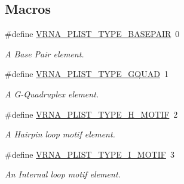 \subsection*{Macros}
\begin{DoxyCompactItemize}
\item 
\mbox{\label{group__struct__utils__plist_ga7c7484a8a1e6704b1aefaf589f3b27c1}} 
\#define \mbox{\hyperlink{group__struct__utils__plist_ga7c7484a8a1e6704b1aefaf589f3b27c1}{V\+R\+N\+A\+\_\+\+P\+L\+I\+S\+T\+\_\+\+T\+Y\+P\+E\+\_\+\+B\+A\+S\+E\+P\+A\+IR}}~0
\begin{DoxyCompactList}\small\item\em A Base Pair element. \end{DoxyCompactList}\item 
\mbox{\label{group__struct__utils__plist_gac91ab79e9feede5347103949ecf04f8a}} 
\#define \mbox{\hyperlink{group__struct__utils__plist_gac91ab79e9feede5347103949ecf04f8a}{V\+R\+N\+A\+\_\+\+P\+L\+I\+S\+T\+\_\+\+T\+Y\+P\+E\+\_\+\+G\+Q\+U\+AD}}~1
\begin{DoxyCompactList}\small\item\em A G-\/\+Quadruplex element. \end{DoxyCompactList}\item 
\mbox{\label{group__struct__utils__plist_ga4d142e0187b8410b61ec2b168ed4513e}} 
\#define \mbox{\hyperlink{group__struct__utils__plist_ga4d142e0187b8410b61ec2b168ed4513e}{V\+R\+N\+A\+\_\+\+P\+L\+I\+S\+T\+\_\+\+T\+Y\+P\+E\+\_\+\+H\+\_\+\+M\+O\+T\+IF}}~2
\begin{DoxyCompactList}\small\item\em A Hairpin loop motif element. \end{DoxyCompactList}\item 
\mbox{\label{group__struct__utils__plist_gadf5905518079b5495bce3394cd7afb9a}} 
\#define \mbox{\hyperlink{group__struct__utils__plist_gadf5905518079b5495bce3394cd7afb9a}{V\+R\+N\+A\+\_\+\+P\+L\+I\+S\+T\+\_\+\+T\+Y\+P\+E\+\_\+\+I\+\_\+\+M\+O\+T\+IF}}~3
\begin{DoxyCompactList}\small\item\em An Internal loop motif element. \end{DoxyCompactList}\item 

\end{DoxyCompactItemize}
